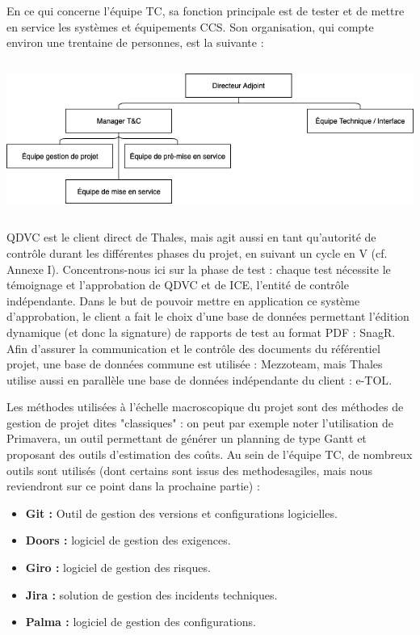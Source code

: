 En ce qui concerne l'équipe \gls{TC}, sa fonction principale est de tester et de mettre en service les systèmes et équipements \gls{CCS}.
Son organisation, qui compte environ une trentaine de personnes, est la suivante :

\begin{center}
\includegraphics[height=5cm]{ressources/images/figures/OBS2.png}
\end{center}

QDVC est le client direct de Thales, mais agit aussi en tant qu'autorité de contrôle durant les différentes phases du projet, en suivant un cycle en V (cf. Annexe I). Concentrons-nous ici sur la phase de test : chaque test nécessite le témoignage et l'approbation de QDVC et de ICE, l'entité de contrôle indépendante.
Dans le but de pouvoir mettre en application ce système d'approbation, le client a fait le choix d'une base de données permettant l'édition dynamique (et donc la signature) de rapports de test au format PDF : \gls{SnagR}.
Afin d'assurer la communication et le contrôle des documents du référentiel projet, une base de données commune est utilisée : \gls{Mezzoteam}, mais Thales utilise aussi en parallèle une  base de données indépendante du client : \gls{e-TOL}.

Les méthodes utilisées à l'échelle macroscopique du projet sont des méthodes de gestion de projet dites "classiques" : on peut par exemple noter l'utilisation de Primavera, un outil permettant de générer un planning de type Gantt et proposant des outils d'estimation des coûts.
Au sein de l'équipe \gls{TC}, de nombreux outils sont utilisés (dont certains sont issus des \gls{methodesagiles}, mais nous reviendront sur ce point dans la prochaine partie) :
\begin{itemize}
\item \textbf{\gls{Git} :} Outil de gestion des versions et configurations logicielles.
\item \textbf{Doors :} logiciel de gestion des exigences.
\item \textbf{Giro :} logiciel de gestion des risques.
\item \textbf{Jira :} solution de gestion des incidents techniques.
\item \textbf{Palma :} logiciel de gestion des configurations.
\end{itemize}

